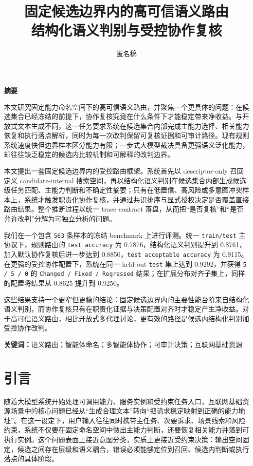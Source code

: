 \documentclass[11pt,a4paper]{ctexart}
\title{\textbf{固定候选边界内的高可信语义路由}\\[0.35em]\large 结构化语义判别与受控协作复核}
\author{匿名稿}
\date{}
\renewenvironment{abstract}{
  \par\small
  \begin{center}\bfseries 摘要\end{center}
  \vspace{-0.6em}
  \noindent\ignorespaces
}{
  \par\vspace{0.2em}
}
\begin{document}
\maketitle
\vspace{-0.8em}

\begin{abstract}
本文研究固定能力命名空间下的高可信语义路由，并聚焦一个更具体的问题：在候选集合已经冻结的前提下，协作复核究竟在什么条件下才能稳定带来净收益。与开放式文本生成不同，这一任务要求系统在候选集合内部完成主能力选择、相关能力恢复和执行落点解析，同时为每一次改判保留可复核证据和可审计路径。现有规则系统速度快但边界样本区分能力有限；一步式大模型裁决具备更强语义泛化能力，却往往缺乏稳定的候选内比较机制和可解释的改判边界。

本文提出一套固定候选边界内的受控路由框架。系统首先以 descriptor-only 召回定义 candidate-internal 搜索空间，再以结构化语义判别在候选集合内部生成候选级任务匹配、主能力判断和不确定性摘要；只有在低置信、高风险或多意图冲突样本上，系统才触发职责化协作复核，并通过共识排序与显式授权决定是否覆盖直接路由结果。整个推断过程以统一 trace contract 落盘，从而把“是否复核”和“是否允许改判”分解为可独立分析的问题。

我们在一个包含 \texttt{563} 条样本的冻结 benchmark 上进行评测。统一 \texttt{train/test} 主协议下，规则路由的 \texttt{test accuracy} 为 0.7876，结构化语义判别提升到 0.8761，加入默认协作复核后进一步达到 0.8850，\texttt{test acceptable accuracy} 为 0.9115。在更强的受控协作配置下，系统在同一 held-out \texttt{test} 集上达到 0.9292，并获得 \texttt{5 / 5 / 0} 的 \texttt{Changed / Fixed / Regressed} 结果；在扩展分布对齐子集上，同样的配置将结果从 0.8625 提升到 0.9250。

这些结果支持一个更窄但更稳的结论：固定候选边界内的主要性能台阶来自结构化语义判别，而协作复核只有在职责化证据与决策配置对齐时才稳定产生净收益。对于高可信语义路由，相比开放式多代理讨论，更有效的路径是候选内结构化判别加受控协作改判。
\end{abstract}

\noindent\textbf{关键词：}语义路由；智能体命名；多智能体协作；可审计决策；互联网基础资源

\section{引言}

随着大模型系统开始处理可调用能力、服务实例和受约束任务入口，互联网基础资源场景中的核心问题已经从“生成合理文本”转向“把请求稳定映射到正确的能力地址”。在这一设定下，用户输入往往同时携带主任务、次要诉求、场景线索和风险约束，系统不仅要在固定命名空间中做出主能力判断，还要恢复相关能力并落到可执行实例。这个问题表面上接近意图分类，实质上更接近受约束决策：输出空间固定，候选之间存在层级和语义耦合，错误必须能够定位到召回、候选内判断或执行落点的具体阶段。
\end{document}
